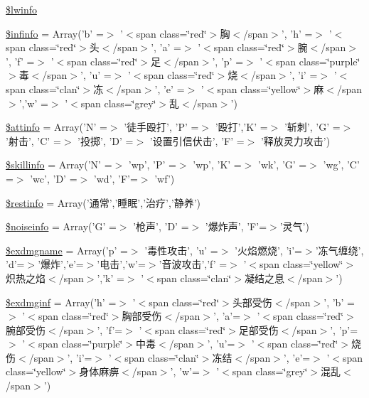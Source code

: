 \begin{DoxyCompactItemize}
\item 
\hyperlink{resources_8php_a8bc9ffb8d571d6f8b62846c5ba0b9749}{\$lwinfo}
\item 
\hyperlink{resources_8php_a33e1d274ac0cd7ca76b5cc43833f5c1f}{\$infinfo} = Array('b' =$>$ '$<$span class=\char`\"{}red\char`\"{}$>$胸$<$/span$>$', 'h' =$>$ '$<$span class=\char`\"{}red\char`\"{}$>$头$<$/span$>$', 'a' =$>$ '$<$span class=\char`\"{}red\char`\"{}$>$腕$<$/span$>$', 'f' =$>$ '$<$span class=\char`\"{}red\char`\"{}$>$足$<$/span$>$', 'p' =$>$ '$<$span class=\char`\"{}purple\char`\"{}$>$毒$<$/span$>$', 'u' =$>$ '$<$span class=\char`\"{}red\char`\"{}$>$烧$<$/span$>$', 'i' =$>$ '$<$span class=\char`\"{}clan\char`\"{}$>$冻$<$/span$>$', 'e' =$>$ '$<$span class=\char`\"{}yellow\char`\"{}$>$麻$<$/span$>$','w' =$>$ '$<$span class=\char`\"{}grey\char`\"{}$>$乱$<$/span$>$')
\item 
\hyperlink{resources_8php_a92eb8a09b2b4554f7502c542f0cdf0d6}{\$attinfo} = Array('N' =$>$ '徒手殴打', 'P' =$>$ '殴打','K' =$>$ '斩刺', 'G' =$>$ '射击', 'C' =$>$ '投掷', 'D' =$>$ '设置引信伏击', 'F' =$>$ '释放灵力攻击')
\item 
\hyperlink{resources_8php_a94b9a3413b45767e103c4f7ad2346921}{\$skillinfo} = Array('N' =$>$ 'wp', 'P' =$>$ 'wp', 'K' =$>$ 'wk', 'G' =$>$ 'wg', 'C' =$>$ 'wc', 'D' =$>$ 'wd', 'F'=$>$ 'wf')
\item 
\hyperlink{resources_8php_a9eadda2ba19f193cb5b6d373f4ec6e00}{\$restinfo} = Array('通常','睡眠','治疗','静养')
\item 
\hyperlink{resources_8php_a332324f513227af3ea62265b79326383}{\$noiseinfo} = Array('G' =$>$ '枪声', 'D' =$>$ '爆炸声', 'F'=$>$'灵气')
\item 
\hyperlink{resources_8php_ae3d186083abb3ad845df2562e1c1df79}{\$exdmgname} = Array('p' =$>$ '毒性攻击', 'u' =$>$ '火焰燃烧', 'i'=$>$'冻气缠绕', 'd'=$>$'爆炸','e'=$>$'电击','w'=$>$'音波攻击','f' =$>$ '$<$span class=\char`\"{}yellow\char`\"{}$>$炽热之焰$<$/span$>$','k' =$>$ '$<$span class=\char`\"{}clan\char`\"{}$>$凝结之息$<$/span$>$')
\item 
\hyperlink{resources_8php_a2de6851aa38cafa604576a1dc520e631}{\$exdmginf} = Array('h' =$>$ '$<$span class=\char`\"{}red\char`\"{}$>$头部受伤$<$/span$>$', 'b' =$>$ '$<$span class=\char`\"{}red\char`\"{}$>$胸部受伤$<$/span$>$', 'a'=$>$ '$<$span class=\char`\"{}red\char`\"{}$>$腕部受伤$<$/span$>$', 'f'=$>$ '$<$span class=\char`\"{}red\char`\"{}$>$足部受伤$<$/span$>$', 'p'=$>$ '$<$span class=\char`\"{}purple\char`\"{}$>$中毒$<$/span$>$', 'u'=$>$ '$<$span class=\char`\"{}red\char`\"{}$>$烧伤$<$/span$>$', 'i'=$>$ '$<$span class=\char`\"{}clan\char`\"{}$>$冻结$<$/span$>$', 'e'=$>$ '$<$span class=\char`\"{}yellow\char`\"{}$>$身体麻痹$<$/span$>$', 'w'=$>$ '$<$span class=\char`\"{}grey\char`\"{}$>$混乱$<$/span$>$')

\end{DoxyCompactItemize}
